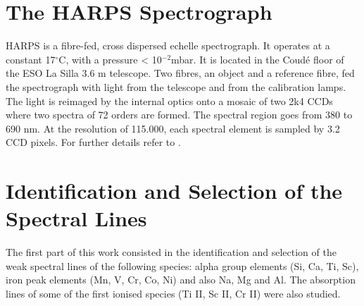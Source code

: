 \documentclass[dvips,12pt,a4paper]{report}
\begin{document}
{\section {The HARPS Spectrograph}


HARPS is a fibre-fed, cross dispersed echelle spectrograph. It operates at a constant 17$^\circ$C, with a pressure < 10$^{-2}$mbar. It is located in the Coud\'{e} floor of the ESO La Silla 3.6 m telescope. Two fibres, an object and a reference fibre, fed the spectrograph with light from the telescope and from the calibration lamps. The light is reimaged by the internal optics onto a mosaic of two 2k4 CCDs where two spectra of 72 orders are formed. The spectral region goes from 380 to 690 nm. At the resolution of 115.000, each spectral element is sampled by 3.2 CCD pixels. For further details refer to \citet{Mayor-2003b}. 



\section {Identification and Selection of the Spectral Lines}

The first part of this work consisted in the identification and selection of the weak spectral lines of the following species: alpha group elements (Si, Ca, Ti, Sc), iron peak elements (Mn, V, Cr, Co, Ni) and also Na, Mg and Al. The absorption lines of some of the first ionised species (Ti II, Sc II, Cr II)  were also studied.

}
\end{document}
